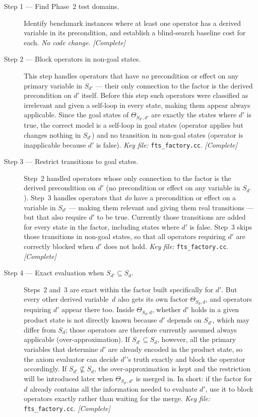 \documentclass[11pt,a4paper]{article}
\begin{document}
\begin{description}
  \item[Step 1 — Find Phase~2 test domains.]
    Identify benchmark instances where at least one operator has a derived
    variable in its precondition, and establish a blind-search baseline cost
    for each.
    \emph{No code change.}  \textit{[Complete]}

  \item[Step 2 — Block operators in non-goal states.]
    This step handles operators that have \emph{no} precondition or effect
    on any primary variable in $S_{d'}$ — their only connection to the
    factor is the derived precondition on $d'$ itself.  Before this step
    such operators were classified as irrelevant and given a self-loop in
    every state, making them appear always applicable.  Since the goal
    states of $\Theta_{S_{d'},d'}$ are exactly the states where $d'$ is
    true, the correct model is a self-loop in goal states (operator
    applies but changes nothing in $S_{d'}$) and no transition in non-goal
    states (operator is inapplicable because $d'$ is false).
    \emph{Key file:} \texttt{fts\_factory.cc}.  \textit{[Complete]}

  \item[Step 3 — Restrict transitions to goal states.]
    Step~2 handled operators whose only connection to the factor is the
    derived precondition on $d'$ (no precondition or effect on any
    variable in $S_{d'}$).  Step~3 handles operators that \emph{do} have
    a precondition or effect on a variable in $S_{d'}$ — making them
    relevant and giving them real transitions — but that also require $d'$
    to be true.  Currently those transitions are added for every state in
    the factor, including states where $d'$ is false.  Step~3 skips those
    transitions in non-goal states, so that all operators requiring $d'$
    are correctly blocked when $d'$ does not hold.
    \emph{Key file:} \texttt{fts\_factory.cc}.  \textit{[Complete]}

  \item[Step 4 — Exact evaluation when $S_{d'} \subseteq S_d$.]
    Steps~2 and~3 are exact within the factor built specifically for $d'$.
    But every other derived variable~$d$ also gets its own factor
    $\Theta_{S_d,d}$, and operators requiring $d'$ appear there too.
    Inside $\Theta_{S_d,d}$, whether $d'$ holds in a given product state
    is not directly known because $d'$ depends on $S_{d'}$, which may
    differ from $S_d$; those operators are therefore currently assumed
    always applicable (over-approximation).  If $S_{d'} \subseteq S_d$,
    however, all the primary variables that determine $d'$ are already
    encoded in the product state, so the axiom evaluator can decide
    $d'$'s truth exactly and block the operator accordingly.  If
    $S_{d'} \not\subseteq S_d$, the over-approximation is kept and the
    restriction will be introduced later when $\Theta_{S_{d'},d'}$ is
    merged in.  In short: if the factor for $d$ already contains all the
    information needed to evaluate $d'$, use it to block operators exactly
    rather than waiting for the merge.
    \emph{Key file:} \texttt{fts\_factory.cc}.  \textit{[Complete]}


\end{description}
\end{document}
